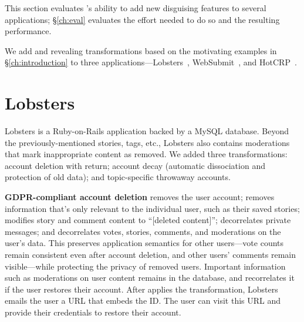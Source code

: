 This section evaluates \sys's ability to add new disguising features to
several applications; \S\ref{ch:eval} evaluates the effort needed to do so and the
resulting performance.
%

%
We add \xxing and revealing transformations based on
the motivating examples in \S\ref{ch:introduction}
to three applications---Lobsters~\cite{lobsters},
WebSubmit~\cite{websubmit-rs},
and HotCRP~\cite{hotcrp}.
%
%
%


\section{Lobsters}
\label{s:cs:lobsters}

%
Lobsters is a Ruby-on-Rails application backed by a MySQL database.
%
Beyond the previously-mentioned stories, tags, etc., Lobsters also contains
moderations that mark inappropriate content as removed.
%
We added three \xxing transformations: account deletion with return; account
decay (\ie automatic dissociation and protection of old data); and topic-specific
throwaway accounts.
%

%
\textbf{GDPR-compliant account deletion}
\one{} removes the user account;
\two{} removes information that's only relevant to the individual user, such as
their saved stories;
\three{} modifies story and comment content to ``[deleted content]'';
\four{} decorrelates private messages; and
\five{} decorrelates votes, stories, comments, and moderations on the user's
data. %
%
%
This preserves application semantics for other users---\eg vote counts remain
consistent even after account deletion, and other users' comments
remain visible---while protecting the privacy of removed users.
%
Important information such as moderations on user content remains in the
database, and \sys recorrelates it if the user restores their account.
%
After \sys applies the \xxing transformation, Lobsters emails the user a URL
that embeds the \xx ID.
%
The user can visit this URL and provide their credentials to restore their account.
%
%

